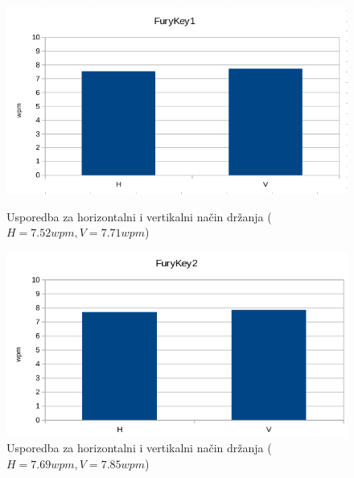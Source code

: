 \documentclass[times, utf8, zavrsni, numeric]{fer}
\begin{document}
\begin{appendices}
\begin{figure}[htb]
  \centering
  \begin{minipage}[b]{0.48\textwidth}
    \includegraphics[width=\textwidth]{img/furykey1_HV.png}
    \caption{Usporedba za horizontalni i vertikalni način držanja ($H=7.52wpm, V=7.71wpm$)}
    \label{chart:furykey1_HV}
  \end{minipage}
  \hfill
  \begin{minipage}[b]{0.48\textwidth}
    \includegraphics[width=\textwidth]{img/furykey2_HV.png}
    \caption{Usporedba za horizontalni i vertikalni način držanja ($H=7.69wpm, V=7.85wpm$)}
    \label{chart:furykey2_HV}
  \end{minipage}
\end{figure}


\end{appendices}
\end{document}
